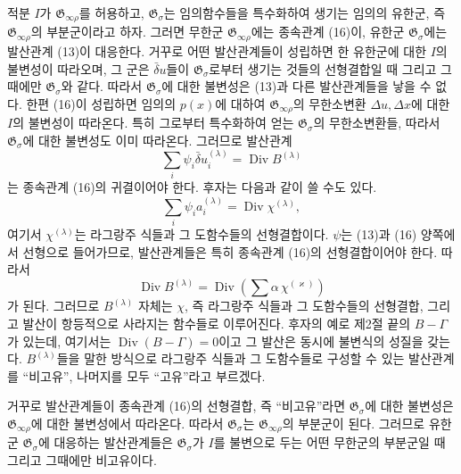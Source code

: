 적분 \(I\)가 \(\mathfrak G_{\infty\rho}\)를 허용하고, \(\mathfrak G_\sigma\)는 임의함수들을 특수화하여 생기는 임의의 유한군, 즉 \(\mathfrak G_{\infty\rho}\)의 부분군이라고 하자. 그러면 무한군 \(\mathfrak G_{\infty\rho}\)에는 종속관계 (16)이, 유한군 \(\mathfrak G_\sigma\)에는 발산관계 (13)이 대응한다. 거꾸로 어떤 발산관계들이 성립하면 한 유한군에 대한 \(I\)의 불변성이 따라오며, 그 군은 \(\bar\delta u\)들이 \(\mathfrak G_\sigma\)로부터 생기는 것들의 선형결합일 때 그리고 그때에만 \(\mathfrak G_\sigma\)와 같다. 따라서 \(\mathfrak G_\sigma\)에 대한 불변성은 (13)과 다른 발산관계들을 낳을 수 없다. 한편 (16)이 성립하면 임의의 \(p(x)\)에 대하여 \(\mathfrak G_{\infty\rho}\)의 무한소변환 \(\Delta u,\Delta x\)에 대한 \(I\)의 불변성이 따라온다. 특히 그로부터 특수화하여 얻는 \(\mathfrak G_\sigma\)의 무한소변환들, 따라서 \(\mathfrak G_\sigma\)에 대한 불변성도 이미 따라온다. 그러므로 발산관계
\[
\sum_i\psi_i\bar\delta u_i^{(\lambda)}
=\operatorname{Div}B^{(\lambda)}
\]
는 종속관계 (16)의 귀결이어야 한다. 후자는 다음과 같이 쓸 수도 있다.
\[
\sum_i\psi_i a_i^{(\lambda)}
=\operatorname{Div}\chi^{(\lambda)},
\]
여기서 \(\chi^{(\lambda)}\)는 라그랑주 식들과 그 도함수들의 선형결합이다. \(\psi\)는 (13)과 (16) 양쪽에서 선형으로 들어가므로, 발산관계들은 특히 종속관계 (16)의 선형결합이어야 한다. 따라서
\[
\operatorname{Div}B^{(\lambda)}
=\operatorname{Div}\left(\sum\alpha\,\chi^{(\varkappa)}\right)
\]
가 된다. 그러므로 \(B^{(\lambda)}\) 자체는 \(\chi\), 즉 라그랑주 식들과 그 도함수들의 선형결합, 그리고 발산이 항등적으로 사라지는 함수들로 이루어진다. 후자의 예로 제2절 끝의 \(B-\Gamma\)가 있는데, 여기서는 \(\operatorname{Div}(B-\Gamma)=0\)이고 그 발산은 동시에 불변식의 성질을 갖는다. \(B^{(\lambda)}\)들을 말한 방식으로 라그랑주 식들과 그 도함수들로 구성할 수 있는 발산관계를 ``비고유'', 나머지를 모두 ``고유''라고 부르겠다.

거꾸로 발산관계들이 종속관계 (16)의 선형결합, 즉 ``비고유''라면 \(\mathfrak G_\sigma\)에 대한 불변성은 \(\mathfrak G_{\infty\rho}\)에 대한 불변성에서 따라온다. 따라서 \(\mathfrak G_\sigma\)는 \(\mathfrak G_{\infty\rho}\)의 부분군이 된다. 그러므로 유한군 \(\mathfrak G_\sigma\)에 대응하는 발산관계들은 \(\mathfrak G_\sigma\)가 \(I\)를 불변으로 두는 어떤 무한군의 부분군일 때 그리고 그때에만 비고유이다.

